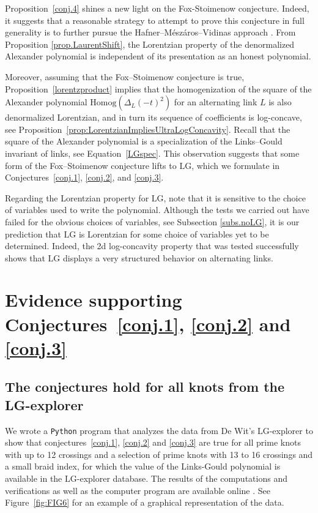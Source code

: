 \documentclass[12pt,reqno]{amsart}
\theoremstyle{definition}
\def\LG{\mathrm{LG}}
\begin{document}
Proposition~\ref{conj.4} shines a new light on the Fox-Stoimenow conjecture. Indeed, it suggests that a reasonable strategy to attempt to prove this conjecture in full generality is to further pursue the Hafner--M\'esz\'aros--Vidinas approach \cite{Hafner}. From Proposition \ref{prop.LaurentShift}, the Lorentzian property of the denormalized Alexander polynomial is independent of its presentation as an honest polynomial.

Moreover, assuming that the Fox--Stoimenow conjecture is true, Proposition~\ref{lorentzproduct} implies that the homogenization of the square of the Alexander polynomial $\mathrm{Homog}(\Delta_L(-t)^2)$ for an alternating link $L$ is also denormalized Lorentzian, and in turn its sequence of coefficients is log-concave, see Proposition~\ref{prop:LorentzianImpliesUltraLogConcavity}. Recall that the square of the Alexander polynomial is a specialization of the Links--Gould invariant of links, see Equation~\eqref{LGspec}. This observation suggests that some form of the Fox--Stoimenow conjecture lifts to $\LG$, which we formulate in Conjectures~\ref{conj.1}, \ref{conj.2}, and \ref{conj.3}. 

Regarding the Lorentzian property for $\LG$, note that it is sensitive to the choice of variables used to write the polynomial. Although the tests we carried out have failed for the obvious choices of variables, see Subsection \ref{subs.noLG}, it is our prediction that $\LG$ is Lorentzian for some choice of variables yet to be determined. Indeed, the 2d log-concavity property that was tested successfully shows that $\LG$ displays a very structured behavior on alternating links.

\section{Evidence supporting Conjectures~\ref{conj.1}, \ref{conj.2} and \ref{conj.3}}\label{sec:Evidence}

\subsection{The conjectures hold for all knots from the LG-explorer} We wrote a \texttt{Python} program that analyzes the data from De Wit's $\LG$-explorer \cite{LGexplorer} to show that conjectures~\ref{conj.1}, \ref{conj.2} and \ref{conj.3} are true for all prime knots with up to 12 crossings and a selection of prime knots with 13 to 16 crossings and a small braid index, for which the value of the Links-Gould polynomial is available in the $\LG$-explorer database. The results of the computations and verifications as well as the computer program are available online \cite{data}. See Figure~\ref{fig:FIG6} for an example of a graphical representation of the data.
\end{document}
